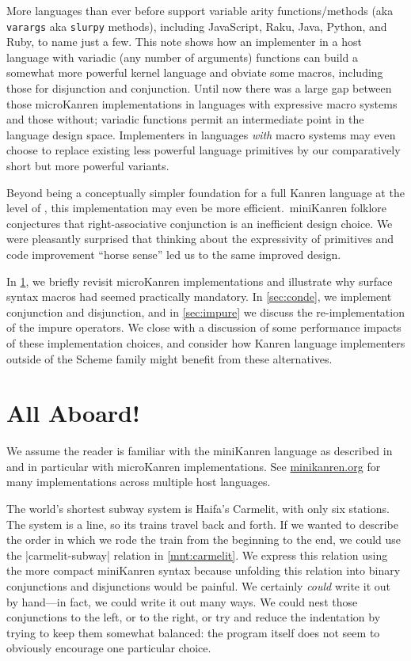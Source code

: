 \documentclass[sigplan,draft,natbib=false]{acmart}
\begin{document}
More languages than ever before support variable arity
functions/methods (aka \verb|varargs| aka \verb|slurpy| methods),
including JavaScript, Raku, Java, Python, and Ruby, to name just a
few. This note shows how an implementer in a host language with
variadic (any number of arguments) functions can build a somewhat more
powerful kernel language and obviate some macros, including those for
disjunction and conjunction. Until now there was a large gap between
those microKanren implementations in languages with expressive macro
systems and those without; variadic functions permit an intermediate
point in the language design space. Implementers in languages
\emph{with} macro systems may even choose to replace existing less
powerful language primitives by our comparatively short but more
powerful variants.

Beyond being a conceptually simpler foundation for a full Kanren
language at the level of , this
implementation may even be more efficient.\ miniKanren folklore
conjectures that right-associative conjunction is an inefficient
design choice. We were pleasantly surprised that thinking about the
expressivity of primitives and code improvement \enquote{horse sense}
led us to the same improved design.

In \cref{sec:all-aboard}, we briefly revisit microKanren
implementations and illustrate why surface syntax macros had seemed
practically mandatory. In
\cref{sec:conde}, we implement conjunction
and disjunction, and in \cref{sec:impure} we discuss the
re-implementation of the impure operators. We close with a discussion
of some performance impacts of these implementation choices, and
consider how Kanren language implementers outside of the Scheme family
might benefit from these alternatives.

\section{All Aboard!}\label{sec:all-aboard}

We assume the reader is familiar with the miniKanren language as
described in  and in particular with
microKanren implementations. See \href{minikanren.org}{minikanren.org}
for many implementations across multiple host languages.

The world's shortest subway system is Haifa's Carmelit, with only
six stations. The system is a line, so its trains travel back and
forth. If we wanted to describe the order in which we rode the train
from the beginning to the end, we could use the
\rackinline|carmelit-subway| relation in \cref{mnt:carmelit}. We
express this relation using the more compact miniKanren syntax because
unfolding this relation into binary conjunctions and disjunctions
would be painful. We certainly \emph{could} write it out by hand---in
fact, we could write it out many ways. We could nest those
conjunctions to the left, or to the right, or try and reduce the
indentation by trying to keep them somewhat balanced: the program
itself does not seem to obviously encourage one particular choice.
\end{document}
